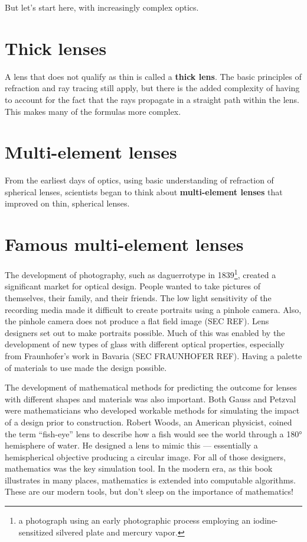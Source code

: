 \documentclass[
  letterpaper,
]{book}
\begin{document}
But let's start here, with increasingly complex optics.

\section{Thick lenses}\label{thick-lenses}

A lens that does not qualify as thin is called a \textbf{thick lens}.
The basic principles of refraction and ray tracing still apply, but
there is the added complexity of having to account for the fact that the
rays propagate in a straight path within the lens. This makes many of
the formulas more complex.

\section{Multi-element lenses}\label{multi-element-lenses}

From the earliest days of optics, using basic understanding of
refraction of spherical lenses, scientists began to think about
\textbf{multi-element lenses} that improved on thin, spherical lenses.

\section{Famous multi-element lenses}\label{sec-optics-multielement}

The development of photography, such as daguerrotype in 1839\footnote{a
  photograph using an early photographic process employing an
  iodine-sensitized silvered plate and mercury vapor.}, created a
significant market for optical design. People wanted to take pictures of
themselves, their family, and their friends. The low light sensitivity
of the recording media made it difficult to create portraits using a
pinhole camera. Also, the pinhole camera does not produce a flat field
image (SEC REF). Lens designers set out to make portraits possible. Much
of this was enabled by the development of new types of glass with
different optical properties, especially from Fraunhofer's work in
Bavaria (SEC FRAUNHOFER REF). Having a palette of materials to use made
the design possible.

The development of mathematical methods for predicting the outcome for
lenses with different shapes and materials was also important. Both
Gauss and Petzval were mathematicians who developed workable methods for
simulating the impact of a design prior to construction. Robert Woods,
an American physicist, coined the term ``fish-eye'' lens to describe how
a fish would see the world through a 180° hemisphere of water. He
designed a lens to mimic this --- essentially a hemispherical objective
producing a circular image. For all of those designers, mathematics was
the key simulation tool. In the modern era, as this book illustrates in
many places, mathematics is extended into computable algorithms. These
are our modern tools, but don't sleep on the importance of mathematics!
\end{document}
